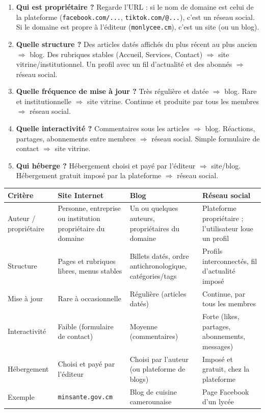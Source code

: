 \documentclass[11pt]{article}
\begin{document}
\begin{methode}
\begin{enumerate}
  \item \textbf{Qui est propriétaire ?} Regarde l'URL : si le nom de domaine est celui de la plateforme (\texttt{facebook.com/...}, \texttt{tiktok.com/@...}), c'est un réseau social. Si le domaine est propre à l'éditeur (\texttt{monlycee.cm}), c'est un site (ou un blog).
  \item \textbf{Quelle structure ?} Des articles datés affichés du plus récent au plus ancien $\Rightarrow$ blog. Des rubriques stables (Accueil, Services, Contact) $\Rightarrow$ site vitrine/institutionnel. Un profil avec un fil d'actualité et des abonnés $\Rightarrow$ réseau social.
  \item \textbf{Quelle fréquence de mise à jour ?} Très régulière et datée $\Rightarrow$ blog. Rare et institutionnelle $\Rightarrow$ site vitrine. Continue et produite par tous les membres $\Rightarrow$ réseau social.
  \item \textbf{Quelle interactivité ?} Commentaires sous les articles $\Rightarrow$ blog. Réactions, partages, abonnements entre membres $\Rightarrow$ réseau social. Simple formulaire de contact $\Rightarrow$ site vitrine.
  \item \textbf{Qui héberge ?} Hébergement choisi et payé par l'éditeur $\Rightarrow$ site/blog. Hébergement gratuit imposé par la plateforme $\Rightarrow$ réseau social.
\end{enumerate}
\end{methode}

\begin{center}
\begin{tabularx}{\linewidth}{|l|X|X|X|}
\hline
\rowcolor{popblueL} \textbf{Critère} & \textbf{Site Internet} & \textbf{Blog} & \textbf{Réseau social} \\
\hline
Auteur / propriétaire & Personne, entreprise ou institution propriétaire du domaine & Un ou quelques auteurs, propriétaires du domaine & Plateforme propriétaire ; l'utilisateur loue un profil \\
\hline
Structure & Pages et rubriques libres, menus stables & Billets datés, ordre antichronologique, catégories/tags & Profils interconnectés, fil d'actualité imposé \\
\hline
Mise à jour & Rare à occasionnelle & Régulière (articles datés) & Continue, par tous les membres \\
\hline
Interactivité & Faible (formulaire de contact) & Moyenne (commentaires) & Forte (likes, partages, abonnements, messages) \\
\hline
Hébergement & Choisi et payé par l'éditeur & Choisi par l'auteur (ou plateforme de blogs) & Imposé et gratuit, chez la plateforme \\
\hline
Exemple & \texttt{minsante.gov.cm} & Blog de cuisine camerounaise & Page Facebook d'un lycée \\
\hline
\end{tabularx}
\end{center}
\end{document}
